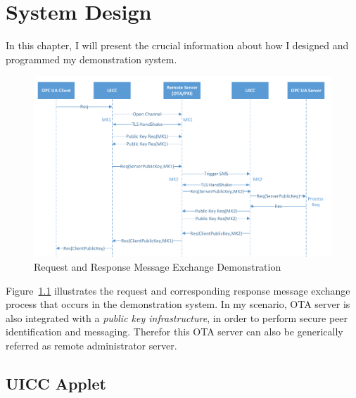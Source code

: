 \chapter{System Design} \label{secDesign}


In this chapter, I will present the crucial information about how I designed and programmed my demonstration system. 

\begin{figure}[!htbp]
	\centering
	\includegraphics[width=1\textwidth]{whole-structure}
		\caption{Request and Response Message Exchange Demonstration}
	\label{fig:whole-structure}
\end{figure}

Figure~\ref{fig:whole-structure} illustrates the request and corresponding response message exchange process that occurs in the demonstration system. In my scenario, OTA server is also integrated with a \emph{public key infrastructure},  in order to perform secure peer identification and messaging. Therefor this OTA server can also be  generically referred as remote administrator server.


\section{UICC Applet}

